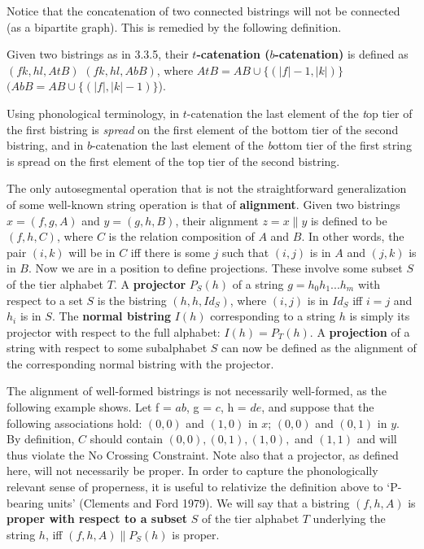 Notice that the concatenation of two connected bistrings will not be connected
(as a bipartite graph). This is remedied by the following definition.

\smallskip{} Given two bistrings as in 3.3.5,
their {\bf $t$-catenation ($b$-catena\-tion)} is defined as $(fk,hl,AtB)$
$(fk,hl,AbB)$, where $AtB = AB \cup \{(|f|-1,|k|)\}$ $(AbB = AB \cup
\{(|f|,|k|-1)\}$).

Using phonological terminology, in $t$-catenation the last element of the {\it
t}op tier of the first bistring is {\it spread} on the first element of the
bottom tier of the second bistring, and in $b$-catenation the last element of
the {\it b}ottom tier of the first string is spread on the first element of
the top tier of the second bistring.  
  

The only autosegmental operation that is not the straightforward
generalization of some well-known string operation is that of {\bf
alignment}. Given two bistrings $x = (f,g,A)$ and $y = (g,h,B)$, their
alignment $z = x\parallel y$ is defined to be $(f,h,C)$, where $C$ is the
relation composition of $A$ and $B$. In other words, the pair $(i,k)$ will be
in $C$ iff there is some $j$ such that $(i,j)$ is in $A$ and $(j,k)$ is in
$B$. Now we are in a position to define projections. These involve some subset
$S$ of the tier alphabet $T$. A {\bf projector} $P_S(h)$ of a string $g =
h_0h_1...h_m$ with respect to a set $S$ is the bistring $(h,h,Id_S)$, where
$(i,j)$ is in $Id_S$ iff $i=j$ and $h_i$ is in $S$.  The {\bf normal bistring}
$I(h)$ corresponding to a string $h$ is simply its projector with respect to
the full alphabet: $I(h) = P_T(h)$. A {\bf projection} of a string with
respect to some subalphabet $S$ can now be defined as the alignment of the
corresponding normal bistring with the projector. 
 
The alignment of well-formed bistrings is not necessarily well-formed, as the
following example shows. Let f = $ab$, g = $c$, h = $de$, and suppose that the
following associations hold: $(0,0)$ and $(1,0)$ in $x$; $(0,0)$ and $(0,1)$
in $y$. By definition, $C$ should contain $(0,0),(0,1),(1,0),$ and $(1,1)$ and
will thus violate the No Crossing Constraint. Note also that a projector, as
defined here, will not necessarily be proper. In order to capture the
phonologically relevant sense of properness, it is useful to relativize the
definition above to `P-bearing units' (Clements and Ford
1979).\nocite{Clements:1979} We will say that a bistring $(f,h,A)$ is {\bf
  proper with respect to a subset} $S$ of the tier alphabet $T$ underlying the
string $h$, iff $(f,h,A)\parallel P_S(h)$ is proper.

